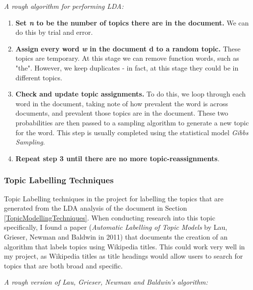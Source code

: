 \documentclass[12pt]{article}
\begin{document}
\emph{A rough algorithm for performing LDA\cite{ldaExplanation}:}

\begin{enumerate}
	\item \textbf{Set \emph{n} to be the number of topics there are in the document.} We can do this by trial and error. \\
	\item \textbf{Assign every word \emph{w} in the document {d} to a random topic.} These topics are temporary. At this stage we can remove function words, such as "the". However, we keep duplicates - in fact, at this stage they could be in different topics. \\
	\item \textbf{Check and update topic assignments.} To do this, we loop through each word in the document, taking note of how prevalent the word is across documents, and prevalent those topics are in the document. These two probabilities are then passed to a sampling algorithm to generate a new topic for the word. This step is usually completed using the statistical model \emph{Gibbs Sampling}.
	\item \textbf{Repeat step 3 until there are no more topic-reassignments}. 
\end{enumerate}

\subsubsection{Topic Labelling Techniques}

Topic Labelling techniques in the project for labelling the topics that are generated from the LDA analysis of the document in Section \ref{TopicModellingTechniques}. When conducting research into this topic specifically, I found a paper (\emph{Automatic Labelling of Topic Models} by Lau, Grieser, Newman and Baldwin in 2011\cite{topicLabelling}) that documents the creation of an algorithm that labels topics using Wikipedia\cite{wikipedia} titles. This could work very well in my project, as Wikipedia titles as title headings would allow users to search for topics that are both broad and specific. 

\emph{A rough version of Lau, Grieser, Newman and Baldwin's algorithm:}

\label{labellingalgorithm}
\end{document}
